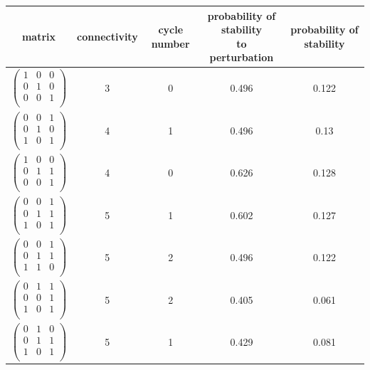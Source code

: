 \documentclass{amsart}
\theoremstyle{definition}
\theoremstyle{remark}
\numberwithin{equation}{section}
\begin{document}
\begin{longtable}{ c || c | c | c | c }
\hline
matrix & connectivity & cycle number & \specialcell{probability of stability\\to perturbation} & probability of stability\\
\hline
$\begin{pmatrix}
1 & 0 & 0\\
0 & 1 & 0\\
0 & 0 & 1\\
\end{pmatrix}$ & 3 & 0 & 0.496 & 0.122\\
$\begin{pmatrix}
0 & 0 & 1\\
0 & 1 & 0\\
1 & 0 & 1\\
\end{pmatrix}$ & 4 & 1 & 0.496 & 0.13\\
$\begin{pmatrix}
1 & 0 & 0\\
0 & 1 & 1\\
0 & 0 & 1\\
\end{pmatrix}$ & 4 & 0 & 0.626 & 0.128\\
$\begin{pmatrix}
0 & 0 & 1\\
0 & 1 & 1\\
1 & 0 & 1\\
\end{pmatrix}$ & 5 & 1 & 0.602 & 0.127\\
$\begin{pmatrix}
0 & 0 & 1\\
0 & 1 & 1\\
1 & 1 & 0\\
\end{pmatrix}$ & 5 & 2 & 0.496 & 0.122\\
$\begin{pmatrix}
0 & 1 & 1\\
0 & 0 & 1\\
1 & 0 & 1\\
\end{pmatrix}$ & 5 & 2 & 0.405 & 0.061\\
$\begin{pmatrix}
0 & 1 & 0\\
0 & 1 & 1\\
1 & 0 & 1\\
\end{pmatrix}$ & 5 & 1 & 0.429 & 0.081\\

\end{longtable}
\end{document}
